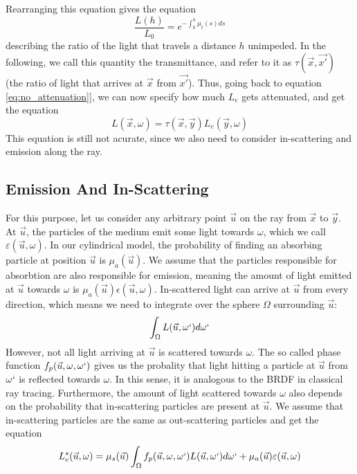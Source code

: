 Rearranging this equation gives the equation
\begin{equation}
\frac{L(h)}{L_0} = e^{-\int_{0}^{h} {\mu}_t(s)ds}
\end{equation}
describing the ratio of the light that travels a distance $h$ unimpeded. In the following, we call this quantity the transmittance, and refer to it as $\tau(\vec{x}, \vec{x'})$ (the ratio of light that arrives at $\vec{x}$ from $\vec{x'}$).
Thus, going back to equation \ref{eq:no_attenuation}], we can now specify how much $L_e$ gets attenuated, and get the equation
\begin{equation}
L(\vec{x},\omega ) =\tau(\vec{x}, \vec{y}) L_e(\vec{y}, \omega )
\end{equation}
This equation is still not acurate, since we also need to consider in-scattering and emission along the ray.
\subsection{Emission And In-Scattering}
For this purpose, let us consider any arbitrary point $\vec{u}$ on the ray from $\vec{x}$ to $\vec{y}$.
At $\vec{u}$, the particles of the medium emit some light towards $\omega$\cite{468400}, which we call $\varepsilon (\vec{u}, \omega )$. In our cylindrical model, the probability of finding an absorbing particle at position $\vec{u}$ is ${\mu}_a(\vec{u})$. We assume that the particles responsible for absorbtion are also responsible for emission\cite{468400}, meaning the amount of light emitted at $\vec{u}$ towards $\omega$ is ${\mu}_a(\vec{u})\epsilon (\vec{u}, \omega )$.
In-scattered light can arrive at $\vec{u}$ from every direction, which means we need to integrate over the sphere $\Omega$ surrounding $\vec{u}$\cite{10.1145/280814.280925}:
\begin{equation}
\int_{\Omega} L(\vec{u}, \omega `)d\omega `
\end{equation}
However, not all light arriving at $\vec{u}$ is scattered towards $\omega $. The so called phase function $f_p(\vec{u}, \omega , \omega `)$ gives us the probality that light hitting a particle at $\vec{u}$ from $\omega `$ is reflected towards $\omega$\cite{10.1145/280814.280925}. In this sense, it is analogous to the BRDF in classical ray tracing. Furthermore, the amount of light scattered towards $\omega $ also depends on the probability that in-scattering particles are present at $\vec{u}$\cite{10.1145/280814.280925}. We assume that in-scattering particles are the same as out-scattering particles and get the equation
\begin{equation}
L_e^s(\vec{u}, \omega ) = {\mu}_s(\vec{u})\int_{\Omega} f_p(\vec{u}, \omega , \omega `)L(\vec{u}, \omega `)d\omega `  + {\mu}_a(\vec{u})\varepsilon (\vec{u}, \omega )
\end{equation}
